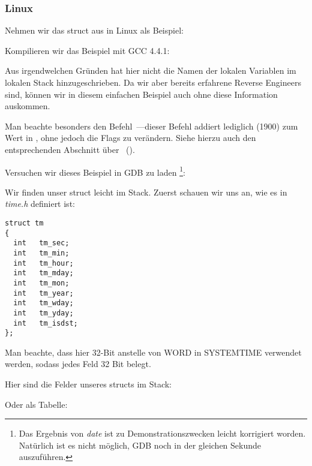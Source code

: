 \subsubsection{Linux}
Nehmen wir das struct  aus  in Linux als Beispiel:



Kompilieren wir das Beispiel mit GCC 4.4.1:


Aus irgendwelchen Gründen hat \IDA hier nicht die Namen der lokalen Variablen im lokalen Stack hinzugeschrieben.
Da wir aber bereits erfahrene Reverse Engineers sind, können wir in diesem einfachen Beispiel auch ohne diese
Information auskommen.

Man beachte besonders den Befehl~---dieser Befehl addiert lediglich  (1900) zum Wert
in \EAX, ohne jedoch die Flags zu verändern. Siehe hierzu auch den entsprechenden Abschnitt über
\LEA{}~().

Versuchen wir dieses Beispiel in GDB zu laden
\footnote{Das Ergebnis von \emph{date} ist zu Demonstrationszwecken leicht korrigiert worden. Natürlich ist es nicht
möglich, GDB noch in der gleichen Sekunde auszuführen.}:


Wir finden unser struct leicht im Stack.
Zuerst schauen wir uns an, wie es in \emph{time.h} definiert ist:

\begin{lstlisting}[caption=time.h, label=struct_tm,style=customc]
struct tm
{
  int	tm_sec;
  int	tm_min;
  int	tm_hour;
  int	tm_mday;
  int	tm_mon;
  int	tm_year;
  int	tm_wday;
  int	tm_yday;
  int	tm_isdst;
};
\end{lstlisting}
Man beachte, dass hier 32-Bit \Tint anstelle von WORD in SYSTEMTIME verwendet werden, sodass jedes Feld 32 Bit belegt.

Hier sind die Felder unseres structs im Stack:



Oder als Tabelle:

